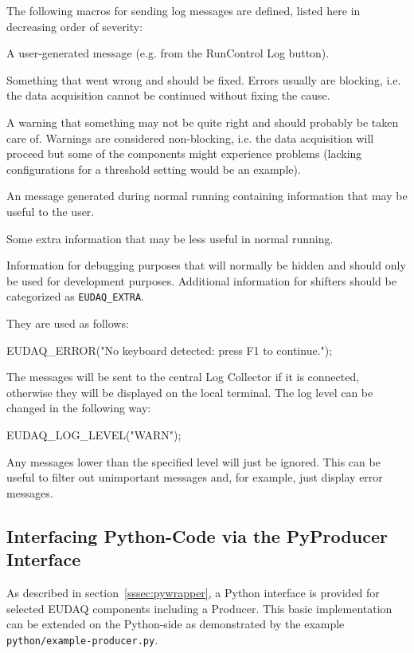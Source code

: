 The following macros for sending log messages are defined,
listed here in decreasing order of severity:
\begin{description}

A user-generated message (e.g. from the RunControl Log button).

Something that went wrong and should be fixed. Errors usually are blocking, i.e. the data acquisition cannot be continued without fixing the cause.

A warning that something may not be quite right and should probably be taken care of. Warnings are considered non-blocking, i.e. the data acquisition will proceed but some of the components might experience problems (lacking configurations for a threshold setting would be an example).

An message generated during normal running containing information that may be useful to the user.

Some extra information that may be less useful in normal running.

Information for debugging purposes that will normally be hidden and should only be used for development purposes. Additional information for shifters should be categorized as \texttt{EUDAQ\_EXTRA}.

\end{description}

They are used as follows:
\begin{listing}
EUDAQ_ERROR("No keyboard detected: press F1 to continue.");
\end{listing}

The messages will be sent to the central Log Collector if it is connected,
otherwise they will be displayed on the local terminal.
The log level can be changed in the following way:
\begin{listing}
EUDAQ_LOG_LEVEL("WARN");
\end{listing}

Any messages lower than the specified level will just be ignored.
This can be useful to filter out unimportant messages and, for example, just display error messages.


\subsection{Interfacing Python-Code via the PyProducer Interface}
As described in section~\ref{sssec:pywrapper}, a Python interface is
provided for selected EUDAQ components including a Producer. This
basic implementation can be extended on the Python-side as
demonstrated by the example \texttt{python/example-producer.py}.

